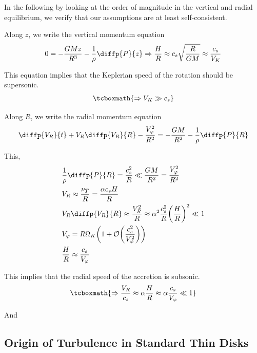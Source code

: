 \documentclass[10pt,a4paper,english]{article}
\let\originalleft\left
\let\originalright\right
\renewcommand{\left}{\mathopen{}\mathclose\bgroup\originalleft}
\renewcommand{\right}{\aftergroup\egroup\originalright}
\begin{document}
In the following by looking at the order of magnitude in the vertical and
radial equilibrium, we verify that our assumptions are at least
self-consistent.

Along $z$, we write the vertical momentum equation
\begin{equation}
    0 = - \frac{G M z} {R^3} - \frac{1}{\rho} \diffp{P}{z} \Rightarrow \frac{H}{R} \approx c_s \sqrt{\frac{R}{G M}} \approx \frac{c_s}{V_K}
\end{equation}

This equation implies that the Keplerian speed of the rotation should be supersonic.
\begin{equation}
    \tcboxmath{
        \Rightarrow V_K \gg c_s
    }
\end{equation}

Along $R$, we write the radial momentum equation
\begin{equation}
    \diffp{V_R}{t} + V_R \diffp{V_R}{R} - \frac{V_\varphi^2}{R^2} = - \frac{G M}{R^2} - \frac{1}{\rho} \diffp{P}{R}
\end{equation}

This,
\begin{align*}
    & \frac{1}{\rho} \diffp{P}{R} = \frac{c_s^2}{R} \ll \frac{G M}{R^2} = \frac{V_\varphi^2}{R^2} \\
    & V_R \approx \frac{\nu_T}{R} = \frac{\alpha c_s H}{R} \\
    & V_R \diffp{V_R}{R} \approx \frac{V_R^2}{R} \approx \alpha^2 \frac{c_s^2}{R} \left(\frac{H}{R}\right)^2 \ll 1\\
    & V_\varphi = R \Omega_K \left(1 + \mathcal{O}\left(\frac{c_s^2}{V_\varphi^2}\right) \right) \\
    & \frac{H}{R} \approx \frac{c_s}{V_\varphi}
\end{align*}

This implies that the radial speed of the accretion is subsonic.
\begin{equation}
    \tcboxmath{
        \Rightarrow \frac{V_R}{c_s} \approx \alpha \frac{H}{R} \approx \alpha \frac{c_s}{V_\varphi} \ll 1
    }
\end{equation}

And %

\subsection{Origin of Turbulence in Standard Thin Disks}
\end{document}

